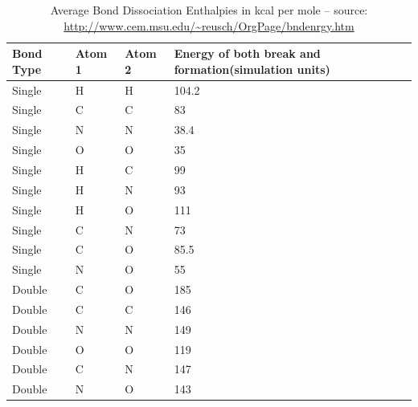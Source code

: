 \begin{table}[t]
	\begin{center}
		\caption[Average Bond Dissociation Enthalpies]{Average Bond Dissociation Enthalpies in kcal per mole -- source: \url{http://www.cem.msu.edu/~reusch/OrgPage/bndenrgy.htm}}\label{default_bond_energies}
		\begin{tabular}{@{}lp{2cm}p{2cm}p{2cm}@{}}
			\toprule
			Bond Type & Atom 1 & Atom 2 & Energy of both break and formation(simulation units) \\
			\midrule
			Single    & H      & H      & 104.2                                                \\
			Single    & C      & C      & 83                                                   \\
			Single    & N      & N      & 38.4                                                 \\
			Single    & O      & O      & 35                                                   \\
			Single    & H      & C      & 99                                                   \\
			Single    & H      & N      & 93                                                   \\
			Single    & H      & O      & 111                                                  \\
			Single    & C      & N      & 73                                                   \\
			Single    & C      & O      & 85.5                                                 \\
			Single    & N      & O      & 55                                                   \\
			Double    & C      & O      & 185                                                  \\
			Double    & C      & C      & 146                                                  \\
			Double    & N      & N      & 149                                                  \\
			Double    & O      & O      & 119                                                  \\
			Double    & C      & N      & 147                                                  \\
			Double    & N      & O      & 143                                                  \\

\end{tabular}
\end{center}
\end{table}
